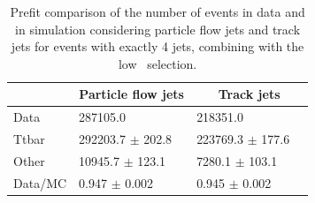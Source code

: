 \documentclass[letterpaper,12pt]{article}
\begin{document}
\begin{table}[!b]
	\centering
	\small
	\setlength\tabcolsep{5pt} 
	\begin{tabular}{|l | ll | ll |}
	\hline
	& \multicolumn{2}{c|}{Particle flow jets} & \multicolumn{2}{c|}{Track jets} \\
	\hline
	Data          &    287105.0                  &        &   218351.0                  &     \\  
	Ttbar         &    292203.7 $\pm$       202.8 &        &   223769.3 $\pm$       177.6 &   \\
	Other         &     10945.7 $\pm$       123.1 &        &     7280.1 $\pm$       103.1 &   \\
	Data/MC       &     0.947   $\pm$       0.002 &        &    0.945   $\pm$        0.002  &           \\
	\hline
	\end{tabular}
	\vspace{0.2cm}
	\caption{Prefit comparison of the  number of events in data and in 
	simulation considering particle flow jets and track jets for 
	events with exactly 4 jets, combining with the low \pt\ selection.}
	\label{tab:yields_standard}
	\end{table}
\end{document}
